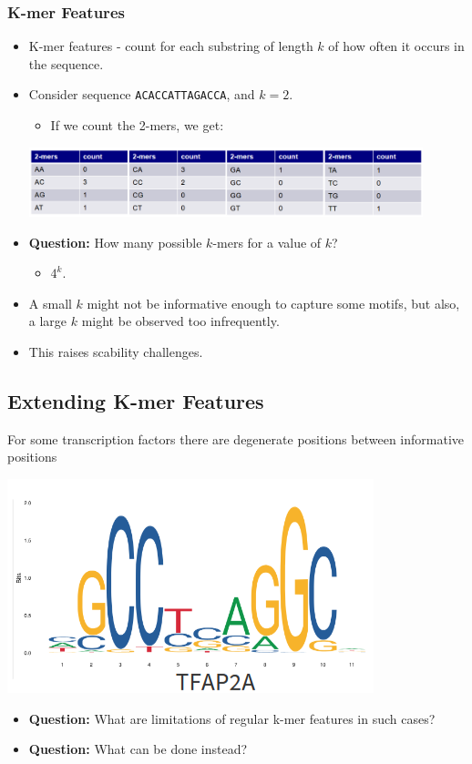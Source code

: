\documentclass[10pt]{article}
\begin{document}
\subsubsection*{K-mer Features}
\begin{itemize}
	\item K-mer features - count for each substring of length $k$ of how often it occurs in the sequence.
	\item Consider sequence \texttt{ACACCATTAGACCA}, and $k = 2$.
	\begin{itemize}
        \item If we count the 2-mers, we get:
    \end{itemize}
    \begin{center} 
        \includegraphics*[width=0.9\textwidth]{W8_7.png} 
    \end{center}
    \item \textbf{Question:} How many possible $k$-mers for a value of $k$?
    \begin{itemize}
        \item $4^k$.
    \end{itemize}
    \item A small $k$ might not be informative enough to capture some motifs, but also, a large $k$ might be observed too infrequently.
    \item This raises scability challenges.
\end{itemize}

\subsection*{Extending K-mer Features}
For some transcription factors there are degenerate positions between informative positions
\begin{center} 
	\includegraphics*[scale=0.7]{W8_8.png} 
\end{center}
\begin{itemize}
	\item \textbf{Question:} What are limitations of regular k-mer features in such cases?
	\item \textbf{Question:} What can be done instead?
\end{itemize}
\end{document}
